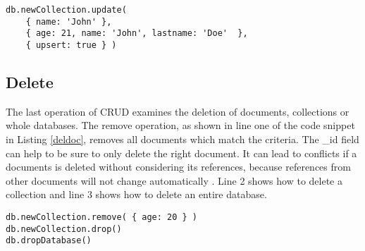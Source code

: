 \begin{lstlisting}[frame=single, caption=Update, label=upddoc]
db.newCollection.update(
    { name: 'John' }, 
    { age: 21, name: 'John', lastname: 'Doe'  }, 
    { upsert: true } )
\end{lstlisting}

\subsection{Delete}

The last operation of CRUD examines the deletion of documents, collections or whole databases. The remove operation, as shown in line one of the code snippet in Listing \ref{deldoc}, removes all documents which match the criteria. The \_id field can help to be sure to only delete the right document. It can lead to conflicts if a documents is deleted without considering its references, because references from other documents will not change automatically \cite{mdbbasics}. Line 2 shows how to delete a collection and line 3 shows how to delete an entire database.

\begin{lstlisting}[frame=single, caption=Delete, label=deldoc]
db.newCollection.remove( { age: 20 } )
db.newCollection.drop()
db.dropDatabase()
\end{lstlisting}

